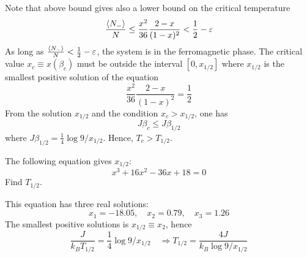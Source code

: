 \documentclass[../../Main/Main.tex]{subfiles}
\begin{document}
\begin{remark}
Note that above bound gives also a lower bound on the critical temperature
\begin{equation*}
    \frac{\expval{N_-} }{N} \le \frac{x^2}{36} \frac{2-x}{(1-x)^2} < \frac{1}{2} - \varepsilon
\end{equation*}
As long as \(   \frac{\expval{N_-} }{N}  < \frac{1}{2} - \varepsilon  \), the system is in the ferromagnetic phase. The critical value \( x_c \equiv x (\beta _c) \) must be outside the interval \( [0,x_{1/2}] \) where \( x_{1/2} \)   is the smallest positive solution of the equation
\begin{equation*}
  \frac{x^2}{36} \frac{2-x}{(1-x)^2} = \frac{1}{2}
\end{equation*}
From the solution \( x_{1/2} \) and the condition \( x_c > x_{1/2} \), one has
\begin{equation*}
  J \beta _c \le J \beta_{1/2}
\end{equation*}
where \( J \beta _{1/2} = \frac{1}{4} \log{9/x_{1/2}}  \). 
Hence, \( T_c > T_{1/2} \).
\end{remark}

\begin{exercise}{}{}
The following equation gives \( x_{1/2} \):
\begin{equation*}
  x^3 + 16x^2 - 36 x + 18 = 0
\end{equation*}
 Find \( T_{1/2} \).
\begin{solution}
This equation has three real solutions:
\begin{equation*}
    x_1 =-18.05, \quad x_2=0.79, \quad x_3=1.26
\end{equation*}
The smallest positive solutions is \( x_{1/2} \equiv x_2 \), hence 
\begin{equation*}
\frac{J}{k_B T_{1/2} } = \frac{1}{4} \log{9/x_{1/2}} \quad \Rightarrow 
T_{1/2} = \frac{4J}{k_B \log{9/x_{1/2}}}
\end{equation*}
\end{solution}
\end{exercise}


\clearpage
\end{document}
